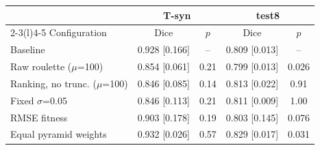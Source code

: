 \begin{tabular}{@{}lcccc@{}}
\toprule
 & \multicolumn{2}{c}{T-syn} & \multicolumn{2}{c}{test8} \\
\cmidrule(lr){2-3}\cmidrule(l){4-5}
Configuration & Dice & $p$ & Dice & $p$ \\
\midrule
Baseline & 0.928 [0.166] & -- & 0.809 [0.013] & -- \\
\addlinespace
Raw roulette ($\mu$=100) & 0.854 [0.061] & 0.21 & 0.799 [0.013] & 0.026 \\
Ranking, no trunc. ($\mu$=100) & 0.846 [0.085] & 0.14 & 0.813 [0.022] & 0.91 \\
Fixed $\sigma$=0.05 & 0.846 [0.113] & 0.21 & 0.811 [0.009] & 1.00 \\
RMSE fitness & 0.903 [0.178] & 0.19 & 0.803 [0.145] & 0.076 \\
Equal pyramid weights & 0.932 [0.026] & 0.57 & 0.829 [0.017] & 0.031 \\
\bottomrule
\end{tabular}

